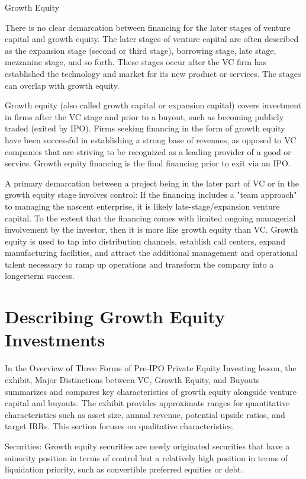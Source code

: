 \documentclass[11pt]{article}
\begin{document}
Growth Equity

There is no clear demarcation between financing for the later stages of venture capital and growth equity. The later stages of venture capital are often described as the expansion stage (second or third stage), borrowing stage, late stage, mezzanine stage, and so forth. These stages occur after the VC firm has established the technology and market for its new product or services. The stages can overlap with growth equity.

Growth equity (also called growth capital or expansion capital) covers investment in firms after the VC stage and prior to a buyout, such as becoming publicly traded (exited by IPO). Firms seeking financing in the form of growth equity have been successful in establishing a strong base of revenues, as opposed to VC companies that are striving to be recognized as a leading provider of a good or service. Growth equity financing is the final financing prior to exit via an IPO.

A primary demarcation between a project being in the later part of VC or in the growth equity stage involves control: If the financing includes a "team approach" to managing the nascent enterprise, it is likely late-stage/expansion venture capital. To the extent that the financing comes with limited ongoing managerial involvement by the investor, then it is more like growth equity than VC. Growth equity is used to tap into distribution channels, establish call centers, expand manufacturing facilities, and attract the additional management and operational talent necessary to ramp up operations and transform the company into a longerterm success.

\section*{Describing Growth Equity Investments}
In the Overview of Three Forms of Pre-IPO Private Equity Investing lesson, the exhibit, Major Distinctions between VC, Growth Equity, and Buyouts summarizes and compares key characteristics of growth equity alongside venture capital and buyouts. The exhibit provides approximate ranges for quantitative characteristics such as asset size, annual revenue, potential upside ratios, and target IRRs. This section focuses on qualitative characteristics.

Securities: Growth equity securities are newly originated securities that have a minority position in terms of control but a relatively high position in terms of liquidation priority, such as convertible preferred equities or debt.
\end{document}
